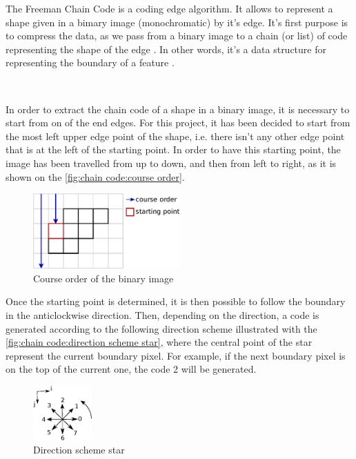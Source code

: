 The Freeman Chain Code is a coding edge algorithm. It allows to represent a shape given in a bimary image (monochromatic) by it's edge. It's first purpose is to compress the data, as we pass from a binary image to a chain (or list) of code representing the shape of the edge \cite{bib:chain:ParametreGeometriqueChaineFreeman}. In other words, it's a data structure for representing the boundary of a feature \cite{bib:chain:DigitalImageProcessing}.

~~

In order to extract the chain code of a shape in a binary image, it is necessary to start from on of the end edges. For this project, it has been decided to start from the most left upper edge point of the shape, i.e. there isn't any other edge point that is at the left of the starting point. In order to have this starting point, the image has been travelled from up to down, and then from left to right, as it is shown on the \vref{fig:chain code:course order}.

\begin{figure}[H]
	\centering
	\includegraphics[width=0.5\textwidth]{images/chain_code/course_order}
	\caption{Course order of the binary image \cite{bib:chain:ParametreGeometriqueChaineFreeman}}
	\label{fig:chain code:course order}	
\end{figure}

Once the starting point is determined, it is then possible to follow the boundary in the anticlockwise direction. Then, depending on the direction, a code is generated according to the following direction scheme illustrated with the \vref{fig:chain code:direction scheme star}, where the central point of the star represent the current boundary pixel. For example, if the next boundary pixel is on the top of the current one, the code 2 will be generated. 


\begin{figure}[H]
	\centering
	\includegraphics[width=0.2\textwidth]{images/chain_code/direction_scheme_star}
	\caption{Direction scheme star \cite{bib:chain:ParametreGeometriqueChaineFreeman}}
	\label{fig:chain code:direction scheme star}	
\end{figure}


